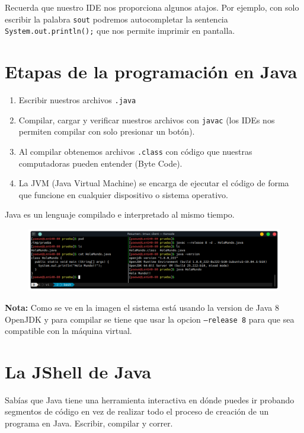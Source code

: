 \documentclass{article}
\begin{document}
Recuerda que nuestro IDE nos proporciona algunos atajos. Por ejemplo, con solo
escribir la palabra \texttt{sout} podremos autocompletar la sentencia
\texttt{System.out.println();} que nos permite imprimir en pantalla.\\

\section{Etapas de la programación en Java}%
\begin{enumerate}
  \item Escribir nuestros archivos \texttt{.java}
  \item Compilar, cargar y verificar nuestros archivos con \texttt{javac} (los
    IDEs nos permiten compilar con solo presionar un botón).
  \item Al compilar obtenemos archivos \texttt{.class} con código que nuestras
    computadoras pueden entender (Byte Code).
  \item La JVM (Java Virtual Machine) se encarga de ejecutar el código de forma
    que funcione en cualquier dispositivo o sistema operativo.
\end{enumerate}

Java es un lenguaje compilado e interpretado al mismo tiempo.\\

\begin{figure}[h!]
  \centering
  \includegraphics[scale=0.6]{./Pictures/035_compilar_java_terminal.png}
\end{figure}

\textbf{Nota: }Como se ve en la imagen el sistema está usando la version de
Java 8 OpenJDK y para compilar se tiene que usar la opcion \texttt{--release 8}
para que sea compatible con la máquina virtual.\\


\newpage

\section{La JShell de Java}%
Sabías que Java tiene una herramienta interactiva en dónde puedes ir probando
segmentos de código en vez de realizar todo el proceso de creación de un
programa en Java. Escribir, compilar y correr.\\
\end{document}
